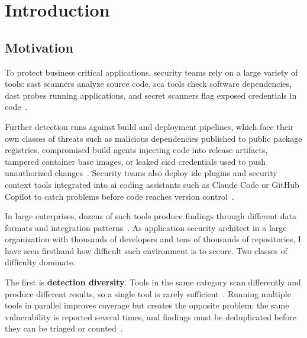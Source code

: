 \chapter*{Introduction}

\section*{Motivation}

To protect business critical applications, security teams rely on a large variety of tools: \gls{sast} scanners analyze source code, \gls{sca} tools check software dependencies, \gls{dast} probes running applications, and secret scanners flag exposed credentials in code~\parencite{Chess2007, Howard2006, Stuttard2011}.

Further detection runs against build and deployment pipelines, which face their own classes of threats such as malicious dependencies published to public package registries, compromised build agents injecting code into release artifacts, tampered container base images, or leaked \gls{cicd} credentials used to push unauthorized changes~\parencite{Ohm2020, SLSA2024}. Security teams also deploy \gls{ide} plugins and security context tools integrated into \gls{ai} coding assistants such as Claude Code or GitHub Copilot to catch problems before code reaches version control~\parencite{GitHubGHAS2025, Snyk2024, Semgrep2024}.

In large enterprises, dozens of such tools produce findings through different data formats and integration patterns~\parencite{Anderson2020, Stallings2024}. As application security architect in a large organization with thousands of developers and tens of thousands of repositories, I have seen firsthand how difficult such environment is to secure. Two classes of difficulty dominate.

The first is \textbf{detection diversity}. Tools in the same category scan differently and produce different results, so a single tool is rarely sufficient~\parencite{Chess2007, McGraw2006}. Running multiple tools in parallel improves coverage but creates the opposite problem: the same vulnerability is reported several times, and findings must be deduplicated before they can be triaged or counted~\parencite{Jacobs2020, Gartner2023ASPM}.

